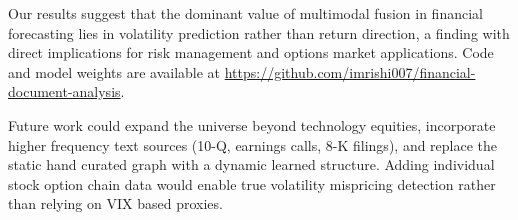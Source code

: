 \documentclass[10pt, twocolumn, a4paper]{article}
\begin{document}
Our results suggest that the dominant value of multimodal fusion in
financial forecasting lies in volatility prediction rather than return
direction, a finding with direct implications for risk management and
options market applications. Code and model weights are available at
\url{https://github.com/imrishi007/financial-document-analysis}.

Future work could expand the universe beyond technology equities, incorporate
higher frequency text sources (10{-}Q, earnings calls, 8{-}K filings), and
replace the static hand curated graph with a dynamic learned structure.
Adding individual stock option chain data would enable true volatility
mispricing detection rather than relying on VIX based proxies.


\newpage

\end{document}
